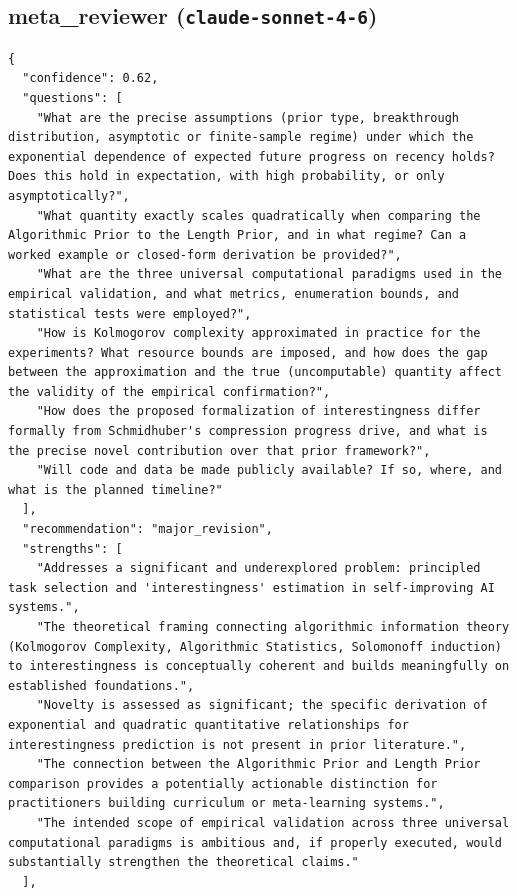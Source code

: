 \documentclass[11pt]{article}
\begin{document}
\subsection*{meta_reviewer (\texttt{claude-sonnet-4-6})}
\begin{verbatim}
{
  "confidence": 0.62,
  "questions": [
    "What are the precise assumptions (prior type, breakthrough distribution, asymptotic or finite-sample regime) under which the exponential dependence of expected future progress on recency holds? Does this hold in expectation, with high probability, or only asymptotically?",
    "What quantity exactly scales quadratically when comparing the Algorithmic Prior to the Length Prior, and in what regime? Can a worked example or closed-form derivation be provided?",
    "What are the three universal computational paradigms used in the empirical validation, and what metrics, enumeration bounds, and statistical tests were employed?",
    "How is Kolmogorov complexity approximated in practice for the experiments? What resource bounds are imposed, and how does the gap between the approximation and the true (uncomputable) quantity affect the validity of the empirical confirmation?",
    "How does the proposed formalization of interestingness differ formally from Schmidhuber's compression progress drive, and what is the precise novel contribution over that prior framework?",
    "Will code and data be made publicly available? If so, where, and what is the planned timeline?"
  ],
  "recommendation": "major_revision",
  "strengths": [
    "Addresses a significant and underexplored problem: principled task selection and 'interestingness' estimation in self-improving AI systems.",
    "The theoretical framing connecting algorithmic information theory (Kolmogorov Complexity, Algorithmic Statistics, Solomonoff induction) to interestingness is conceptually coherent and builds meaningfully on established foundations.",
    "Novelty is assessed as significant; the specific derivation of exponential and quadratic quantitative relationships for interestingness prediction is not present in prior literature.",
    "The connection between the Algorithmic Prior and Length Prior comparison provides a potentially actionable distinction for practitioners building curriculum or meta-learning systems.",
    "The intended scope of empirical validation across three universal computational paradigms is ambitious and, if properly executed, would substantially strengthen the theoretical claims."
  ],

\end{verbatim}
\end{document}
